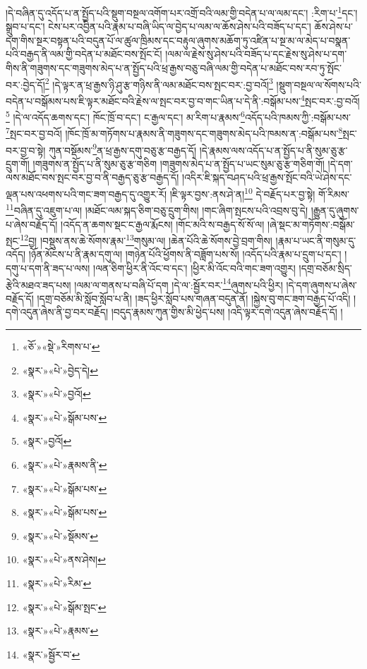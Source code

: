 །དེ་བཞིན་དུ་འདོད་པ་ན་སྤྱོད་པའི་སྡུག་བསྔལ་འགོག་པར་འགྲོ་བའི་ལམ་གྱི་བདེན་པ་ལ་ལམ་དང་། :རིག་པ་\footnote{«ཅོ་»«སྡེ་»རིགས་པ་}དང་། སྒྲུབ་པ་དང་། ངེས་པར་འབྱིན་པའི་རྣམ་པ་བཞི་ཡིད་ལ་བྱེད་པ་ལམ་ལ་ཆོས་ཤེས་པའི་བཟོད་པ་དང་། ཆོས་ཤེས་པ་དག་གིས་སྔར་བསྟན་པའི་བདུན་པོ་ལ་ཚུལ་ཁྲིམས་དང་བརྟུལ་ཞུགས་མཆོག་ཏུ་འཛིན་པ་སྔ་མ་ལ་མེད་པ་བསྣན་པའི་བརྒྱད་ནི་ལམ་གྱི་བདེན་པ་མཐོང་བས་སྤོང་ངོ། །ལམ་ལ་རྗེས་སུ་ཤེས་པའི་བཟོད་པ་དང་རྗེས་སུ་ཤེས་པ་དག་གིས་ནི་གཟུགས་དང་གཟུགས་མེད་པ་ན་སྤྱོད་པའི་ཕྲ་རྒྱས་བཅུ་བཞི་ལམ་གྱི་བདེན་པ་མཐོང་བས་རབ་ཏུ་སྤོང་བར་:བྱེད་དོ།\footnote{«སྣར་»«པེ་»བྱེད་དེ།} །དེ་ལྟར་ན་ཕྲ་རྒྱས་ཉི་ཤུ་རྩ་གཉིས་ནི་ལམ་མཐོང་བས་སྤང་བར་:བྱ་བའོ།\footnote{«སྣར་»«པེ་»བྱའོ།} །སྡུག་བསྔལ་ལ་སོགས་པའི་བདེན་པ་བསྒོམས་པས་ཇི་ལྟར་མཐོང་བའི་རྗེས་ལ་སྤང་བར་བྱ་བ་གང་ཡིན་པ་དེ་ནི་:བསྒོམ་པས་\footnote{«སྣར་»«པེ་»སྒོམ་པས་}སྤང་བར་:བྱ་བའོ།\footnote{«སྣར་»བྱའོ།} །དེ་ལ་འདོད་ཆགས་དང་། ཁོང་ཁྲོ་བ་དང་། ང་རྒྱལ་དང་། མ་རིག་པ་རྣམས་\footnote{«སྣར་»«པེ་»རྣམས་ནི་}འདོད་པའི་ཁམས་ཀྱི་:བསྒོམ་པས་\footnote{«སྣར་»«པེ་»སྒོམ་པས་}སྤང་བར་བྱ་བའོ། །ཁོང་ཁྲོ་མ་གཏོགས་པ་རྣམས་ནི་གཟུགས་དང་གཟུགས་མེད་པའི་ཁམས་ན་:བསྒོམ་པས་\footnote{«སྣར་»«པེ་»སྒོམ་པས་}སྤང་བར་བྱ་བ་སྟེ། ཀུན་བསྡོམས་\footnote{«སྣར་»«པེ་»སྡོམས་}ན་ཕྲ་རྒྱས་དགུ་བཅུ་རྩ་བརྒྱད་དོ། །དེ་རྣམས་ལས་འདོད་པ་ན་སྤྱོད་པ་ནི་སུམ་ཅུ་རྩ་དྲུག་གོ། །གཟུགས་ན་སྤྱོད་པ་ནི་སུམ་ཅུ་རྩ་གཅིག །གཟུགས་མེད་པ་ན་སྤྱོད་པ་ཡང་སུམ་ཅུ་རྩ་གཅིག་གོ། །དེ་དག་ལས་མཐོང་བས་སྤང་བར་བྱ་བ་ནི་བརྒྱད་ཅུ་རྩ་བརྒྱད་དོ། །འདིར་ཇི་སྐད་བཤད་པའི་ཕྲ་རྒྱས་སྤོང་བའི་ཡེ་ཤེས་དང་ལྡན་པས་འཕགས་པའི་གང་ཟག་བརྒྱད་དུ་འགྱུར་རོ། །ཇི་ལྟར་བྱས་:ནས་ཤེ་ན།\footnote{«སྣར་»«པེ་»ནས་ཤེས།} དེ་བརྗོད་པར་བྱ་སྟེ། གོ་རིམས་\footnote{«སྣར་»«པེ་»རིམ་}བཞིན་དུ་འཇུག་པ་ལ། །མཐོང་ལམ་སྐད་ཅིག་བཅུ་དྲུག་གིས། །གང་ཞིག་སྤངས་པའི་འབྲས་བུ་དེ། །རྒྱུན་དུ་ཞུགས་པ་ཞེས་བརྗོད་དོ། །འདོད་ན་ཆགས་སྡང་ང་རྒྱལ་རྨོངས། །གོང་མའི་ས་བརྒྱད་སོ་སོ་ལ། །ཞེ་སྡང་མ་གཏོགས་:བསྒོམ་སྤང་\footnote{«སྣར་»«པེ་»སྒོམ་སྤང་}བྱ། །བསྡུས་ནས་ཆེ་སོགས་རྣམ་\footnote{«སྣར་»«པེ་»རྣམས་}གསུམ་ལ། །ཆེན་པོའི་ཆེ་སོགས་བྱེ་བྲག་གིས། །རྣམ་པ་ཡང་ནི་གསུམ་དུ་འདོད། །ཉོན་མོངས་པ་ནི་རྣམ་དགུ་ལ། །གཉེན་པོའི་ཕྱོགས་ནི་བཟློག་པས་སོ། །འདོད་པའི་རྣམ་པ་དྲུག་པ་དང་། །དགུ་པ་དག་ནི་ཟད་པ་ལས། །ལན་ཅིག་ཕྱིར་ནི་འོང་བ་དང་། །ཕྱིར་མི་འོང་བའི་གང་ཟག་འགྱུར། །དགྲ་བཅོམ་སྲིད་རྩེའི་མཐའ་ཟད་པས། །ལམ་ལ་གནས་པ་བཞི་པོ་དག །དེ་ལ་:སྦྱོར་བར་\footnote{«སྣར་»སྦྱོར་བ་}ཞུགས་པའི་ཕྱིར། །དེ་དག་ཞུགས་པ་ཞེས་བརྗོད་དོ། །དགྲ་བཅོམ་མི་སློབ་སློབ་པ་ནི། །ཟད་ཕྱིར་སློབ་པས་གཞན་བདུན་ནོ། །སྐྱེས་བུ་གང་ཟག་བརྒྱད་པོ་འདི། །དགེ་འདུན་ཞེས་ནི་བྱ་བར་བརྗོད། །བདུད་རྣམས་ཀུན་གྱིས་མི་ཕྱེད་པས། །འདི་ལྟར་དགེ་འདུན་ཞེས་བརྗོད་དོ། །
